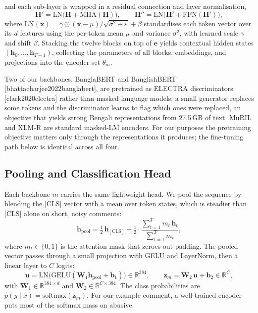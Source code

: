 \documentclass[11pt,a4paper]{article}
\def\citep#1{[#1]}%
\def\texttt#1{#1}%
\def\emph#1{#1}%
\begin{document}
and each sub-layer is wrapped in a residual connection and layer normalisation,
\begin{equation}
\mathbf{H}' = \mathrm{LN}\!\big(\mathbf{H} + \mathrm{MHA}(\mathbf{H})\big),
\qquad
\mathbf{H}'' = \mathrm{LN}\!\big(\mathbf{H}' + \mathrm{FFN}(\mathbf{H}')\big),
\label{eq:block}
\end{equation}
where $\mathrm{LN}(\mathbf{x}) = \gamma \odot (\mathbf{x} - \mu)/\sqrt{\sigma^2 + \varepsilon} + \beta$ standardises each token vector over its $d$ features using the per-token mean $\mu$ and variance $\sigma^2$, with learned scale $\gamma$ and shift $\beta$. Stacking the twelve blocks on top of $\mathbf{e}$ yields contextual hidden states $(\mathbf{h}_0, \ldots, \mathbf{h}_{T-1})$, collecting the parameters of all blocks, embeddings, and projections into the encoder set $\theta_m$.

Two of our backbones, BanglaBERT and BanglishBERT \citep{bhattacharjee2022banglabert}, are pretrained as ELECTRA discriminators \citep{clark2020electra} rather than masked language models: a small generator replaces some tokens and the discriminator learns to flag which ones were replaced, an objective that yields strong Bengali representations from 27.5\,GB of text. MuRIL and XLM-R are standard masked-LM encoders. For our purposes the pretraining objective matters only through the representations it produces; the fine-tuning path below is identical across all four.

\subsection{Pooling and Classification Head}
\label{sec:head}

Each backbone $m$ carries the same lightweight head. We pool the sequence by blending the \texttt{[CLS]} vector with a mean over token states, which is steadier than \texttt{[CLS]} alone on short, noisy comments:
\begin{equation}
\mathbf{h}_{\mathrm{pool}} = \tfrac{1}{2}\,\mathbf{h}_{[\mathrm{CLS}]} + \tfrac{1}{2}\cdot\frac{\sum_{t=1}^{T} m_t\,\mathbf{h}_t}{\sum_{t=1}^{T} m_t},
\label{eq:pool}
\end{equation}
where $m_t \in \{0,1\}$ is the attention mask that zeroes out padding. The pooled vector passes through a small projection with GELU and LayerNorm, then a linear layer to $C$ logits:
\begin{equation}
\mathbf{u} = \mathrm{LN}\!\big(\mathrm{GELU}(\mathbf{W}_1 \mathbf{h}_{\mathrm{pool}} + \mathbf{b}_1)\big) \in \mathbb{R}^{384},
\qquad
\mathbf{z}_m = \mathbf{W}_2\,\mathbf{u} + \mathbf{b}_2 \in \mathbb{R}^{C},
\label{eq:head}
\end{equation}
with $\mathbf{W}_1 \in \mathbb{R}^{384 \times d}$ and $\mathbf{W}_2 \in \mathbb{R}^{C \times 384}$. The class probabilities are $\hat{p}(y \mid x) = \mathrm{softmax}(\mathbf{z}_m)$. For our example comment, a well-trained encoder puts most of the softmax mass on \emph{abusive}.
\end{document}
